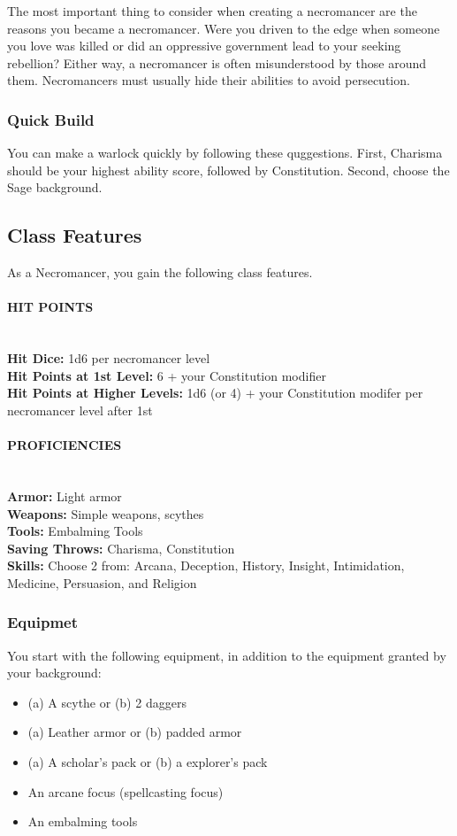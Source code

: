The most important thing to consider when creating a necromancer are the reasons you became a necromancer. Were you driven to the edge when someone you love was killed or did an oppressive government lead to your seeking rebellion? Either way, a necromancer is often misunderstood by those around them. Necromancers must usually hide their abilities to avoid persecution.

\subsubsection{Quick Build}
You can make a warlock quickly by following these quggestions. First, Charisma should be your highest ability score, followed by Constitution. Second, choose the Sage background.

\subsection{Class Features}
As a Necromancer, you gain the following class features.

\paragraph{HIT POINTS}\mbox{}\\
\textbf{Hit Dice:} 1d6 per necromancer level\\
\textbf{Hit Points at 1st Level:} 6 + your Constitution modifier\\
\textbf{Hit Points at Higher Levels:} 1d6 (or 4) + your  Constitution modifer per necromancer level after 1st

\paragraph{PROFICIENCIES}\mbox{}\\
\textbf{Armor:} Light armor\\
\textbf{Weapons:} Simple weapons, scythes\\
\textbf{Tools:} Embalming Tools\\
\textbf{Saving Throws:} Charisma, Constitution\\
\textbf{Skills:} Choose 2 from: Arcana, Deception, History, Insight, Intimidation, Medicine, Persuasion, and Religion

\subsubsection{Equipmet}
You start with the following equipment, in addition to the equipment granted by your background:
\begin{itemize}
\item (a) A scythe or (b) 2 daggers
\item (a) Leather armor or (b) padded armor
\item (a) A scholar's pack or (b) a explorer's pack
\item An arcane focus (spellcasting focus)
\item An embalming tools
\end{itemize}

